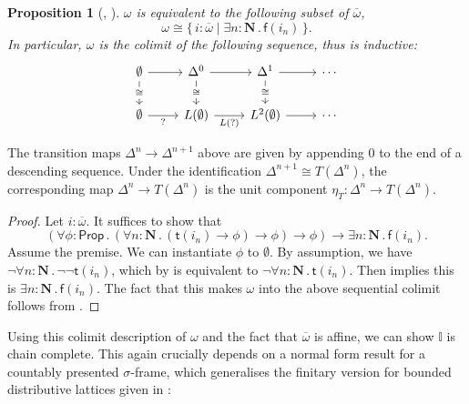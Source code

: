 \documentclass[a4paper,12pt]{amsart}
\newtheorem{proposition}[theorem]{Proposition}
\theoremstyle{definition}
\newtheorem{remark}[theorem]{Remark}
\newcommand{\mb}[1]{\mathbf{#1}}
\newcommand{\mbb}[1]{\mathbb{#1}}
\newcommand{\I}{\mbb I}
\newcommand{\ms}[1]{\mathsf{#1}}
\newcommand{\ov}[1]{\overline{#1}}
\newcommand{\scomp}[2]{\{\,#1\mid#2\,\}}
\newcommand{\prth}[1]{\left(#1\right)}
\newcommand{\N}{\mb N}
\newcommand{\fa}[2]{\forall #1\!\colon\!\!#2\mathpunct{.}}
\newcommand{\ex}[2]{\exists #1\!\colon\!\!#2\mathpunct{.}}
\newcommand{\emp}{\emptyset}
\newcommand{\pp}{\ms{Prop}}
\newcommand\istsym{\ms{t}}
\newcommand\isfsym{\ms{f}}
\newcommand\ist[1]{\istsym(#1)}
\newcommand\isf[1]{\isfsym(#1)}
\begin{document}
\begin{proposition}[\AxiomNT, \AxiomSQCC]\label{prop:omegacolimit}
  $\omega$ is equivalent to the following subset of $\ov\omega$,
  \[ \omega \cong \scomp{i : \ov\omega}{\ex n{\N} \isf{i_n}}\text{.} \]
  In particular, $\omega$ is the colimit of the following sequence, thus is inductive:
  \[\begin{tikzcd}
    \emp & {\Delta^0} & {\Delta^1} & \cdots \\
    \emp & {L(\emp)} & {L^2(\emp)} & \cdots
    \arrow[from=1-1, to=1-2]
    \arrow["\cong"{description}, from=1-1, to=2-1]
    \arrow[from=1-2, to=1-3]
    \arrow["\cong"{description}, from=1-2, to=2-2]
    \arrow[from=1-3, to=1-4]
    \arrow["\cong"{description}, from=1-3, to=2-3]
    \arrow["{?}"', from=2-1, to=2-2]
    \arrow["{L(?)}"', from=2-2, to=2-3]
    \arrow[from=2-3, to=2-4]
  \end{tikzcd}\]
\end{proposition}

The transition maps $\Delta^n\to \Delta^{n+1}$ above are given by appending $0$ to the end of a descending sequence. Under the identification $\Delta^{n+1}\cong T(\Delta^n)$, the corresponding map $\Delta^n\to T(\Delta^n)$ is the unit component $\eta_T\colon \Delta^n\to T(\Delta^{n})$.

\begin{proof}
  Let $i : \ov\omega$. It suffices to show that
  \[ \prth{\fa\phi{\pp} (\fa n{\N} (\ist{i_n} \to \phi) \to \phi) \to \phi} \to \ex{n}\N \isf{i_n}\text{.} \]
  Assume the premise. We can instantiate $\phi$ to $\emp$. By assumption, we have $\neg\fa n\N \neg\neg\ist{i_n}$, which by  is equivalent to $\neg\fa n\N \ist{i_n}$. Then  implies this is $\ex n\N \isf{i_n}$. The fact that this makes $\omega$ into the above sequential colimit follows from \citet[Cor.~1.10]{VANOOSTEN2000233}.
\end{proof}

  

Using this colimit description of $\omega$ and the fact that $\ov\omega$ is affine, we can show $\I$ is chain complete. This again crucially depends on a normal form result for a countably presented $\sigma$-frame, which generalises the finitary version for bounded distributive lattices given in :
\end{document}
